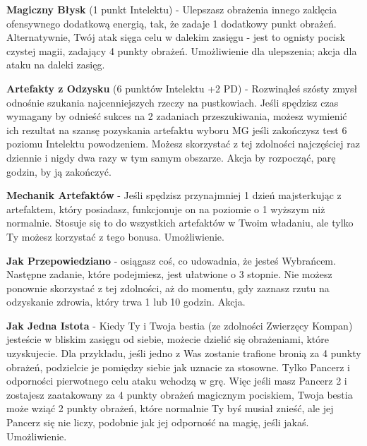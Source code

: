 \textbf{Magiczny Błysk}\label{sec:Magiczny Błysk} (1 punkt Intelektu) - Ulepszasz obrażenia innego zaklęcia ofensywnego dodatkową energią, tak, że zadaje 1 dodatkowy punkt obrażeń. Alternatywnie, Twój atak sięga celu w dalekim zasięgu - jest to ognisty pocisk czystej magii, zadający 4 punkty obrażeń. Umożliwienie dla ulepszenia; akcja dla ataku na daleki zasięg.  

\textbf{Artefakty z Odzysku}\label{sec:Artefakty z Odzysku} (6 punktów Intelektu +2 PD) - Rozwinąłeś szósty zmysł odnośnie szukania najcenniejszych rzeczy na pustkowiach. Jeśli spędzisz czas wymagany by odnieść sukces na 2 zadaniach przeszukiwania, możesz wymienić ich rezultat na szansę pozyskania artefaktu wyboru MG jeśli zakończysz test 6 poziomu Intelektu powodzeniem. Możesz skorzystać z tej zdolności najczęściej raz dziennie i nigdy dwa razy w tym samym obszarze. Akcja by rozpocząć, parę godzin, by ją zakończyć.

\textbf{Mechanik Artefaktów}\label{sec:Mechanik Artefaktów} - Jeśli spędzisz przynajmniej 1 dzień majsterkując z artefaktem, który posiadasz, funkcjonuje on na poziomie o 1 wyższym niż normalnie. Stosuje się to do wszystkich artefaktów w Twoim władaniu, ale tylko Ty możesz korzystać z tego bonusa. Umożliwienie.

\textbf{Jak Przepowiedziano}\label{sec:Jak Przepowiedziano} - osiągasz coś, co udowadnia, że jesteś Wybrańcem. Następne zadanie, które podejmiesz, jest ułatwione o 3 stopnie. Nie możesz ponownie skorzystać z tej zdolności, aż do momentu, gdy zaznasz rzutu na odzyskanie zdrowia, który trwa 1 lub 10 godzin. Akcja.

\textbf{Jak Jedna Istota}\label{sec:Jak Jedna Istota} - Kiedy Ty i Twoja bestia (ze zdolności Zwierzęcy Kompan) jesteście w bliskim zasięgu od siebie, możecie dzielić się obrażeniami, które uzyskujecie. Dla przykładu, jeśli jedno z Was zostanie trafione bronią za 4 punkty obrażeń, podzielcie je pomiędzy siebie jak uznacie za stosowne. Tylko Pancerz i odporności pierwotnego celu ataku wchodzą w grę. Więc jeśli masz Pancerz 2 i zostajesz zaatakowany za 4 punkty obrażeń magicznym pociskiem, Twoja bestia może wziąć 2 punkty obrażeń, które normalnie Ty byś musiał znieść, ale jej Pancerz się nie liczy, podobnie jak jej odporność na magię, jeśli jakaś. Umożliwienie. 

